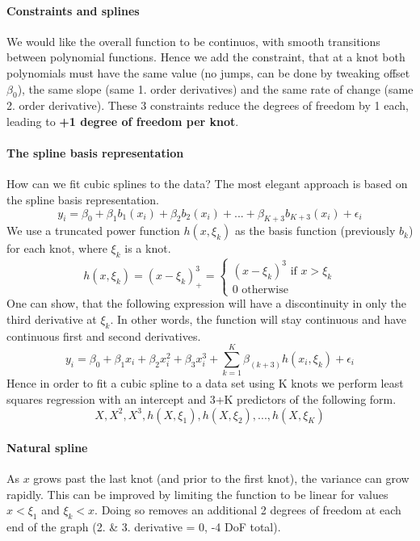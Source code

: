 \documentclass[../document.tex]{subfiles}
\begin{document}
	\paragraph{Constraints and splines}
	We would like the overall function to be continuos, with smooth transitions between polynomial functions. Hence we add the constraint, that at a knot both polynomials must have the same value (no jumps, can be done by tweaking offset $\beta_0$), the same slope (same 1. order derivatives) and the same rate of change (same 2. order derivative). These 3 constraints reduce the degrees of freedom by 1 each, leading to \textbf{+1 degree of freedom per knot}.

	\paragraph{The spline basis representation}
	How can we fit cubic splines to the data? The most elegant approach is based on the spline basis representation.
	\begin{equation}
		y_{i}=\beta_{0}+\beta_{1}b_{1}(x_{i})+\beta_{2}b_{2}(x_{i})+...+\beta_{K+3}b_{K+3}(x_{i})+\epsilon_{i}
	\end{equation}
	We use a truncated power function $h(x, \xi_k)$ as the basis function (previously $b_k$) for each knot, where $\xi_k$ is a knot.
	\begin{equation}
		h(x,\xi_k)=(x-\xi_k)_{+}^3=
		\begin{cases}
			(x-\xi_k)^3 \text{  if  } x > \xi_k\\
			0 \text{  otherwise  }
		\end{cases}
	\end{equation}
	One can show, that the following expression will have a discontinuity in only the third derivative at \(\xi_k\). In other words, the function will stay continuous and have continuous first and second derivatives.
	\begin{equation}
		y_{i}=\beta_{0}+\beta_{1}x_{i}+\beta_{2}x_{i}^2+\beta_{3}x_{i}^3 + \sum_{k=1}^{K}{\beta_{(k+3)}h(x_i,\xi_k)}+\epsilon_{i}
	\end{equation}
	Hence in order to fit a cubic spline to a data set using K knots we perform least squares regression with an intercept and 3+K predictors of the following form.
	\begin{equation}
		X, X^2, X^3, h(X,\xi_{1}),h(X,\xi_{2}),...,h(X,\xi_{K})
	\end{equation}

	\paragraph{Natural spline}
	As $x$ grows past the last knot (and prior to the first knot), the variance can grow rapidly. This can be improved by limiting the function to be linear for values $x<\xi_1$ and $\xi_k<x$. Doing so removes an additional 2 degrees of freedom at each end of the graph (2. \& 3. derivative = 0, -4 DoF total).
\end{document}
